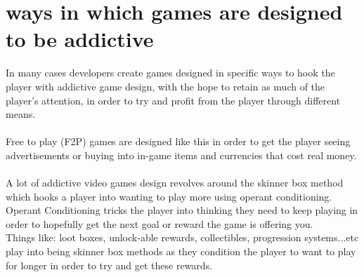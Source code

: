 \documentclass{scrartcl}
\begin{document}
\section{ways in which games are designed to be addictive}
In many cases developers create games designed in specific ways to hook the player with addictive game design, with the hope to retain as much of the player's attention, in order to try and profit from the player through different means.\cite{AddictiveDesign1, AddictiveDesign2}
\\
\\
Free to play (F2P) games are designed like this in order to get the player seeing advertisements or buying into in-game items and currencies that cost real money.\cite{FreeToPlay} \cite{Ethics2}
\\
\\
A lot of addictive video games design revolves around the skinner box method 
which hooks a player into wanting to play more using operant conditioning. \cite{SkinnerBox} Operant Conditioning tricks the player into thinking they need to keep playing in order to hopefully get the next goal or reward the game is offering you.
\\
Things like: loot boxes, unlock-able rewards, collectibles, progression systems...etc play into being skinner box methods as they condition the player to want to play for longer in order to try and get these rewards.
\cite{AddictiveDesign4}
\end{document}
